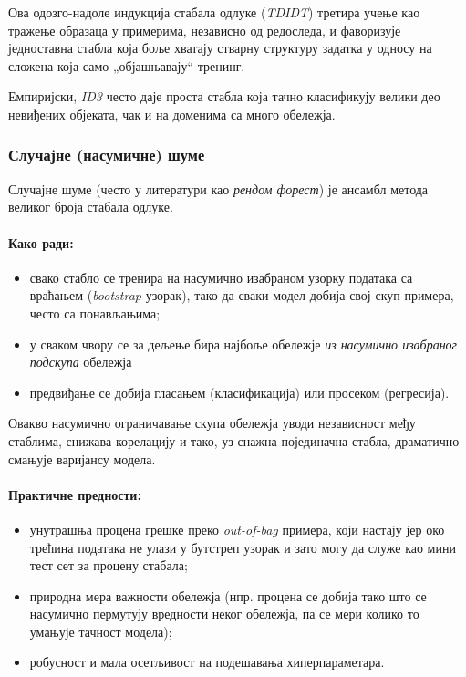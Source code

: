 Ова одозго-надоле индукција стабала одлуке (\textit{TDIDT}) третира учење као тражење образаца у примерима, независно од редоследа, и фаворизује једноставна стабла која боље хватају стварну структуру задатка у односу на сложена која само „објашњавају“ тренинг.

Емпиријски, \textit{ID3} често даје проста стабла која тачно класификују велики део невиђених објеката, чак и на доменима са много обележја. \cite{quinlan1996induction}

\subsubsection{Случајне (насумичне) шуме}

Случајне шуме (често у литератури као \textit{рендом форест}) је ансамбл метода великог броја стабала одлуке.

\paragraph{Како ради:}
\begin{itemize}
  \item свако стабло се тренира на насумично изабраном узорку података са враћањем (\textit{bootstrap} узорак), тако да сваки модел добија свој скуп примера, често са понављањима;  \item у сваком чвору се за дељење бира најбоље обележје \emph{из насумично изабраног подскупа} обележја
  \item предвиђање се добија гласањем (класификација) или просеком (регресија).
\end{itemize}

Овакво насумично ограничавање скупа обележја уводи независност међу стаблима, снижава корелацију и тако, уз снажна појединачна стабла, драматично смањује варијансу модела.

\paragraph{Практичне предности:}
\begin{itemize}
  \item унутрашња процена грешке преко \textit{out-of-bag} примера, који настају јер око трећина података не улази у бутстреп узорак и зато могу да служе као мини тест сет за процену стабала;
  \item природна мера важности обележја (нпр. процена се добија тако што се насумично пермутују вредности неког обележја, па се мери колико то умањује тачност модела);
  \item робусност и мала осетљивост на подешавања хиперпараметара.
\end{itemize}


